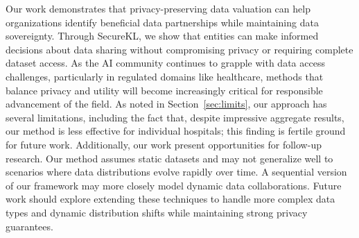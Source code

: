 

Our work demonstrates that privacy-preserving data valuation can help organizations identify beneficial data partnerships while maintaining data sovereignty. Through SecureKL, we show that entities can make informed decisions about data sharing without compromising privacy or requiring complete dataset access. As the AI community continues to grapple with data access challenges, particularly in regulated domains like healthcare, methods that balance privacy and utility will become increasingly critical for responsible advancement of the field. As noted in Section~\ref{sec:limits}, our approach has several limitations, including the fact that, despite impressive aggregate results, our method is less effective for individual hospitals; this finding is fertile ground for future work. Additionally, our work present opportunities for follow-up research. Our method assumes static datasets and may not generalize well to scenarios where data distributions evolve rapidly over time. A sequential version of our framework may more closely model dynamic data collaborations. Future work should explore extending these techniques to handle more complex data types and dynamic distribution shifts while maintaining strong privacy guarantees.

\clearpage